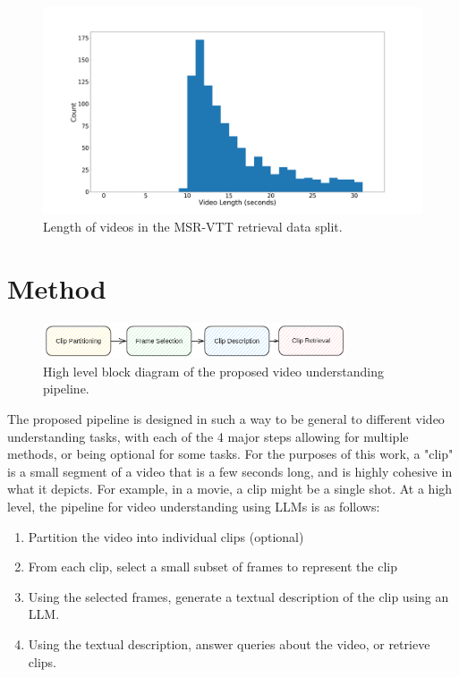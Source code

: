 \documentclass{article}
\begin{document}
\begin{figure}
      \centering
      \includegraphics[width=\textwidth]{figures/msr-vtt-length-histogram.png}
      \caption{Length of videos in the MSR-VTT retrieval data split.}
      \label{fig:length_histogram}
\end{figure}

\section{Method}

\begin{figure}
      \centering
      \includegraphics[width=0.8\textwidth]{figures/pipeline.png}
      \caption{High level block diagram of the proposed video understanding pipeline.}
      \label{fig:pipeline}
\end{figure}

The proposed pipeline is designed in such a way to be general to different video understanding tasks, with each of the 4 major steps allowing for multiple methods, or being optional for some tasks.
For the purposes of this work, a "clip" is a small segment of a video that is a few seconds long, 
and is highly cohesive in what it depicts. For example, in a movie, a clip might be a single shot.
At a high level, the pipeline for video understanding using LLMs is as follows:
\begin{enumerate}
      \item Partition the video into individual clips (optional)
      \item From each clip, select a small subset of frames to represent the clip
      \item Using the selected frames, generate a textual description of the clip using an LLM.
      \item Using the textual description, answer queries about the video, or retrieve clips.
\end{enumerate}
\end{document}
